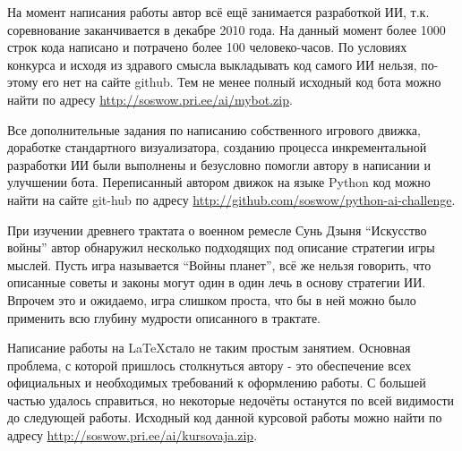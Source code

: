 \documentclass[12pt]{report}
\begin{document}
На момент написания работы автор всё ещё занимается разработкой ИИ, т.к. соревнование заканчивается в декабре 2010 года. На данный момент более 1000 строк кода написано и потрачено более 100 человеко-часов. По условиях конкурса и исходя из здравого смысла выкладывать код самого ИИ нельзя, по-этому его нет на сайте github. Тем не менее полный исходный код бота можно найти по адресу \url{http://soswow.pri.ee/ai/mybot.zip}.

Все дополнительные задания по написанию собственного игрового движка, доработке стандартного визуализатора, созданию процесса инкрементальной разработки ИИ были выполнены и безусловно помогли автору в написании и улучшении бота. Переписанный автором движок на языке Python код можно найти на сайте git-hub по адресу \url{http://github.com/soswow/python-ai-challenge}.

При изучении древнего трактата о военном ремесле Сунь Дзыня ``Искусство войны'' автор обнаружил несколько подходящих под описание стратегии игры мыслей. Пусть игра называется ``Войны планет'', всё же нельзя говорить, что описанные советы и законы могут один в один лечь в основу стратегии ИИ. Впрочем это и ожидаемо, игра слишком проста, что бы в ней можно было применить всю глубину мудрости описанного в трактате.

Написание работы на \LaTeX стало не таким простым занятием. Основная проблема, с которой пришлось столкнуться автору - это обеспечение всех официальных и необходимых требований к оформлению работы. С большей частью удалось справиться, но некоторые недочёты останутся по всей видимости до следующей работы. Исходный код данной курсовой работы  можно найти по адресу \url{http://soswow.pri.ee/ai/kursovaja.zip}.

\clearpage
{}



\end{document}
